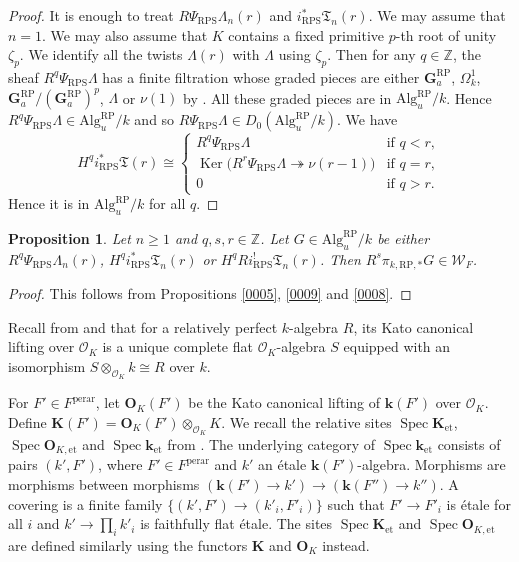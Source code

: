 \documentclass{amsart}
\newtheorem{Prop}[Thm]{Proposition}
\theoremstyle{remark}
\numberwithin{equation}{section}
\newcommand{\Order}{\mathcal{O}}
\newcommand{\onto}{\twoheadrightarrow}
\newcommand{\tensor}{\mathbin{\otimes}}
\newcommand{\Z}{\mathbb{Z}}
\newcommand{\et}{\mathrm{et}}
\newcommand{\Ga}{\mathbf{G}_{a}}
\newcommand{\perar}{\mathrm{perar}}
\newcommand{\Alg}{\mathrm{Alg}}
\newcommand{\alg}[1]{\mathbf{#1}}
\newcommand{\RP}{\mathrm{RP}}
\newcommand{\RPS}{\mathrm{RPS}}
\DeclareMathOperator{\Ker}{Ker}
\DeclareMathOperator{\Spec}{Spec}
\begin{document}
\begin{proof}
	It is enough to treat $R \Psi_{\RPS} \Lambda_{n}(r)$ and $i_{\RPS}^{\ast} \mathfrak{T}_{n}(r)$.
	We may assume that $n = 1$.
	We may also assume that $K$ contains a fixed primitive $p$-th root of unity $\zeta_{p}$.
	We identify all the twists $\Lambda(r)$ with $\Lambda$ using $\zeta_{p}$.
	Then for any $q \in \Z$, the sheaf $R^{q} \Psi_{\RPS} \Lambda$ has a finite filtration
	whose graded pieces are either $\Ga^{\RP}$, $\Omega_{k}^{1}$, $\Ga^{\RP} / (\Ga^{\RP})^{p}$, $\Lambda$ or $\nu(1)$
	by \cite[Proposition 6.1]{KS19}.
	All these graded pieces are in $\Alg^{\RP}_{u} / k$.
	Hence $R^{q} \Psi_{\RPS} \Lambda \in \Alg^{\RP}_{u} / k$
	and so $R \Psi_{\RPS} \Lambda \in D_{0}(\Alg^{\RP}_{u} / k)$.
	We have
		\[
				H^{q} i_{\RPS}^{\ast} \mathfrak{T}(r)
			\cong
				\begin{cases}
						R^{q} \Psi_{\RPS} \Lambda
					&	\text{if }
						q < r,
					\\
						\Ker \bigl(
							R^{r} \Psi_{\RPS} \Lambda \onto \nu(r - 1)
						\bigr)
					&	\text{if }
						q = r,
					\\
						0
					&	\text{if }
						q > r.
				\end{cases}
		\]
	Hence it is in $\Alg^{\RP}_{u} / k$ for all $q$.
\end{proof}

\begin{Prop} \label{0010}
	Let $n \ge 1$ and $q, s, r \in \Z$.
	Let $G \in \Alg^{\RP}_{u} / k$ be either
	$R^{q} \Psi_{\RPS} \Lambda_{n}(r)$, $H^{q} i_{\RPS}^{\ast} \mathfrak{T}_{n}(r)$
	or $H^{q} R i_{\RPS}^{!} \mathfrak{T}_{n}(r)$.
	Then $R^{s} \pi_{k, \RP, \ast} G \in \mathcal{W}_{F}$.
\end{Prop}

\begin{proof}
	This follows from Propositions \ref{0005}, \ref{0009} and \ref{0008}.
\end{proof}

Recall from \cite[Section 1, Definition 1]{Kat82} and \cite[Section 2.3]{Suz24}
that for a relatively perfect $k$-algebra $R$,
its Kato canonical lifting over $\Order_{K}$ is a unique complete flat $\Order_{K}$-algebra $S$
equipped with an isomorphism $S \tensor_{\Order_{K}} k \cong R$ over $k$.

For $F' \in F^{\perar}$, let $\alg{O}_{K}(F')$ be
the Kato canonical lifting of $\alg{k}(F')$ over $\Order_{K}$.
Define $\alg{K}(F') = \alg{O}_{K}(F') \tensor_{\Order_{K}} K$.
We recall the relative sites $\Spec \alg{K}_{\et}$, $\Spec \alg{O}_{K, \et}$ and $\Spec \alg{k}_{\et}$
from \cite[Sections 4.1 and 5.1]{Suz24}.
The underlying category of $\Spec \alg{k}_{\et}$ consists of pairs $(k', F')$,
where $F' \in F^{\perar}$ and $k'$ an \'etale $\alg{k}(F')$-algebra.
Morphisms are morphisms between morphisms $(\alg{k}(F') \to k') \to (\alg{k}(F'') \to k'')$.
A covering is a finite family $\{(k', F') \to (k'_{i}, F'_{i})\}$
such that $F' \to F'_{i}$ is \'etale for all $i$
and $k' \to \prod_{i} k'_{i}$ is faithfully flat \'etale.
The sites $\Spec \alg{K}_{\et}$ and $\Spec \alg{O}_{K, \et}$ are defined similarly
using the functors $\alg{K}$ and $\alg{O}_{K}$ instead.
\end{document}
